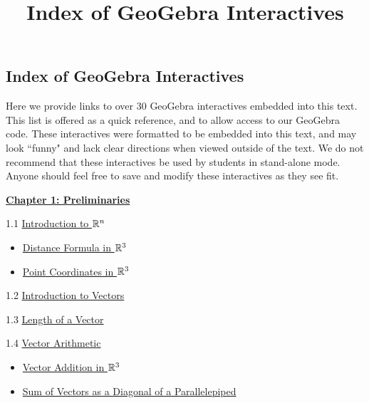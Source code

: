 \documentclass{ximera}
\title{Index of GeoGebra Interactives} \license{CC BY-NC-SA 4.0}
\begin{document}
\begin{abstract}
\end{abstract}
\maketitle

\begin{onlineOnly}
\section*{Index of GeoGebra Interactives}
\end{onlineOnly}

Here we provide links to over 30 GeoGebra interactives embedded into this text.  This list is offered as a quick reference, and to allow access to our GeoGebra code. These interactives were formatted to be embedded into this text, and may look ``funny" and lack clear directions when viewed outside of the text. We do not recommend that these interactives be used by students in stand-alone mode.  Anyone should feel free to save and modify these interactives as they see fit.


\href{https://ximera.osu.edu/oerlinalg/LinearAlgebra/XLAChapter_prelim/main}{\textbf{Chapter 1: Preliminaries}}
	
1.1	\href{https://ximera.osu.edu/oerlinalg/LinearAlgebra/RRN-0010/main}{Introduction to $\mathbb{R}^n$}
\begin{itemize}
\item
\href{https://www.geogebra.org/m/dc267r6v}{Distance Formula in $\mathbb{R}^3$}
\item
\href{https://www.geogebra.org/m/bynu3r84}{Point Coordinates in $\mathbb{R}^3$}
\end{itemize}
	
1.2	\href{https://ximera.osu.edu/oerlinalg/LinearAlgebra/VEC-0010/main}{Introduction to Vectors}
	
1.3	\href{https://ximera.osu.edu/oerlinalg/LinearAlgebra/VEC-0020/main}{Length of a Vector}
	
1.4	\href{https://ximera.osu.edu/oerlinalg/LinearAlgebra/VEC-0030/main}{Vector Arithmetic}

\begin{itemize}
    \item 
    \href{https://www.geogebra.org/m/ccpev33m}{Vector Addition in $\mathbb{R}^3$}
    \item
    \href{https://www.geogebra.org/m/bpzfb7vr}{Sum of Vectors as a Diagonal of a Parallelepiped}
\end{itemize}
	
\end{document}
